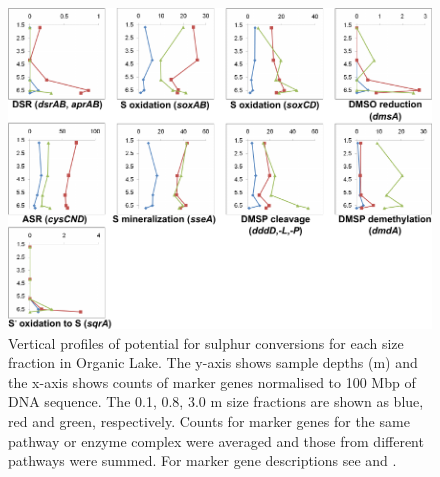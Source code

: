 \begin{figure}
\includegraphics{orglake_figures/s_cycle.pdf}
\caption[Vertical profiles of potential for sulphur cycling in Organic Lake]{Vertical profiles of potential for sulphur conversions for each size fraction in Organic Lake. The y-axis shows sample depths (m) and the x-axis shows counts of marker genes normalised to 100 Mbp of \textsc{DNA} sequence. The 0.1, 0.8, 3.0 \textmu{}m size fractions are shown as blue, red and green, respectively. Counts for marker genes for the same pathway or enzyme complex were averaged and those from different pathways were summed. For marker gene descriptions see  and .}
\label{fig:s_cycle}

\end{figure}
